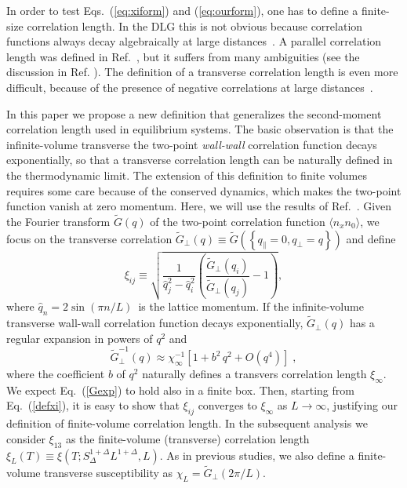 \documentclass[aps,prl,twocolumn,floatfix,amssymb]{revtex4}
\newcommand{\pe}[1]{#1_{\bot}}
\newcommand{\pa}[1]{#1_{\|}}
\newcommand{\su}[2]{\frac{#1}{#2}}
\begin{document}
In order to test Eqs.~(\ref{eq:xiform}) and (\ref{eq:ourform}), 
 one has to define a finite-size 
correlation length. In the DLG this is not obvious because correlation 
functions always decay algebraically at large distances~\cite{Grinstein}. 
A parallel correlation length was defined in Ref.~\cite{Valles8687}, 
but it suffers from many ambiguities (see the discussion in 
Ref. \cite{Zia}). The definition of a transverse 
correlation length is even more difficult, 
because of the presence of negative correlations at large 
distances~\cite{china,Zia}. 
 
In this paper we propose a new definition that 
generalizes the second-moment correlation length 
used in equilibrium systems. 
The basic observation is that the infinite-volume transverse the two-point \emph{wall-wall} 
correlation function decays exponentially, 
so that a transverse correlation 
length can be naturally defined in the thermodynamic limit. 
The extension of this definition to finite volumes requires some care because 
of the conserved dynamics, which makes the two-point function vanish at zero 
momentum. Here, we will use the results of Ref.~\cite{correlation_length}. 
Given the Fourier transform $\widetilde{G}({q})$ of the two-point correlation function $\langle n_{{x}}n_{{0}}\rangle$, 
we focus on the transverse correlation 
$\pe{\widetilde{G}}(q) \equiv \widetilde{G}(\left\{\pa{q}=0,\pe{q}=q\right\})$ and 
define 
\begin{equation} 
\label{defxi} 
 {\xi}_{ij} \equiv 
 \sqrt{\su{1}{\hat{q}_{j}^{2} - \hat{q}_{i}^{2}} 
 \left( \su{\pe{\widetilde{G}}(q_{i})}{ \pe{\widetilde{G}}(q_{j})} -1\right) }, 
\end{equation} 
where $\hat{q}_{n}=2\sin{(\pi n/L)}$\ is the lattice momentum. 
If the infinite-volume transverse wall-wall correlation function 
decays exponentially, $\pe{\widetilde{G}}(q)$ has a regular expansion 
in powers of $q^2$ and 
\begin{equation}
        \pe{\widetilde{G}}^{-1}(q)\approx \chi_{\infty}^{-1} [ 1 + b^{2}\, q^{2}+ O(q^{4})]\; ,\label{Gexp}
\end{equation}
where the coefficient $b$ of $q^2$ naturally defines a transvers correlation length $\xi_{\infty}$.
We expect Eq.~(\ref{Gexp}) to hold also in a finite box. 
Then, starting from Eq.~(\ref{defxi}), it is easy to show that 
${\xi}_{ij}$ converges to $\xi_{\infty}$ as $L\to \infty$, justifying our 
definition of finite-volume correlation length. 
In the subsequent analysis we consider $\xi_{13}$ as the 
finite-volume (transverse) correlation length 
$\xi_L(T) \equiv \xi(T;S_\Delta^{1+\Delta} L^{1 + \Delta}, L)$. 
As in previous studies, 
we also define a finite-volume transverse susceptibility as $\chi_{L} = \pe{\widetilde{G}}(2\pi/L)$. 
 
\end{document}
